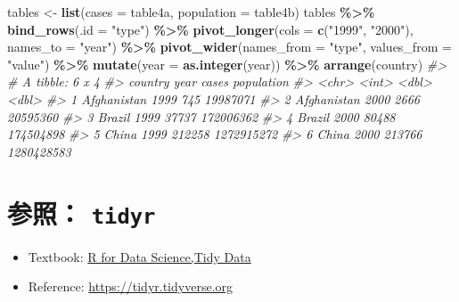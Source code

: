 \documentclass[
  xelatex, ja=standard]{bxjsbook}
\newenvironment{Shaded}{\begin{snugshade}}{\end{snugshade}}
\newcommand{\AttributeTok}[1]{\textcolor[rgb]{0.13,0.29,0.53}{#1}}
\newcommand{\CommentTok}[1]{\textcolor[rgb]{0.56,0.35,0.01}{\textit{#1}}}
\newcommand{\FunctionTok}[1]{\textcolor[rgb]{0.13,0.29,0.53}{\textbf{#1}}}
\newcommand{\NormalTok}[1]{#1}
\newcommand{\OtherTok}[1]{\textcolor[rgb]{0.56,0.35,0.01}{#1}}
\newcommand{\SpecialCharTok}[1]{\textcolor[rgb]{0.81,0.36,0.00}{\textbf{#1}}}
\newcommand{\StringTok}[1]{\textcolor[rgb]{0.31,0.60,0.02}{#1}}
\providecommand{\tightlist}{%
  \setlength{\itemsep}{0pt}\setlength{\parskip}{0pt}}
\theoremstyle{definition}
\theoremstyle{definition}
\theoremstyle{definition}
\theoremstyle{definition}
\theoremstyle{remark}
\begin{document}
\begin{Shaded}
\begin{Highlighting}[]
\NormalTok{tables }\OtherTok{\textless{}{-}} \FunctionTok{list}\NormalTok{(}\AttributeTok{cases =}\NormalTok{ table4a, }\AttributeTok{population =}\NormalTok{ table4b)}
\NormalTok{tables }\SpecialCharTok{\%\textgreater{}\%} \FunctionTok{bind\_rows}\NormalTok{(}\AttributeTok{.id =} \StringTok{"type"}\NormalTok{) }\SpecialCharTok{\%\textgreater{}\%}
  \FunctionTok{pivot\_longer}\NormalTok{(}\AttributeTok{cols =} \FunctionTok{c}\NormalTok{(}\StringTok{"1999"}\NormalTok{, }\StringTok{"2000"}\NormalTok{), }\AttributeTok{names\_to =} \StringTok{"year"}\NormalTok{) }\SpecialCharTok{\%\textgreater{}\%}
  \FunctionTok{pivot\_wider}\NormalTok{(}\AttributeTok{names\_from =} \StringTok{"type"}\NormalTok{, }\AttributeTok{values\_from =} \StringTok{"value"}\NormalTok{) }\SpecialCharTok{\%\textgreater{}\%}
  \FunctionTok{mutate}\NormalTok{(}\AttributeTok{year =} \FunctionTok{as.integer}\NormalTok{(year)) }\SpecialCharTok{\%\textgreater{}\%} \FunctionTok{arrange}\NormalTok{(country)}
\CommentTok{\#\textgreater{} \# A tibble: 6 x 4}
\CommentTok{\#\textgreater{}   country      year  cases population}
\CommentTok{\#\textgreater{}   \textless{}chr\textgreater{}       \textless{}int\textgreater{}  \textless{}dbl\textgreater{}      \textless{}dbl\textgreater{}}
\CommentTok{\#\textgreater{} 1 Afghanistan  1999    745   19987071}
\CommentTok{\#\textgreater{} 2 Afghanistan  2000   2666   20595360}
\CommentTok{\#\textgreater{} 3 Brazil       1999  37737  172006362}
\CommentTok{\#\textgreater{} 4 Brazil       2000  80488  174504898}
\CommentTok{\#\textgreater{} 5 China        1999 212258 1272915272}
\CommentTok{\#\textgreater{} 6 China        2000 213766 1280428583}
\end{Highlighting}
\end{Shaded}

\hypertarget{ux53c2ux7167-tidyr}{%
\section{\texorpdfstring{参照： \texttt{tidyr}}{参照： tidyr}}\label{ux53c2ux7167-tidyr}}

\begin{itemize}
\tightlist
\item
  Textbook: \href{https://r4ds.had.co.nz/tidy-data.html\#tidy-data}{R for Data Science,Tidy Data}
\item
  Reference: \url{https://tidyr.tidyverse.org}
\end{itemize}
\end{document}
